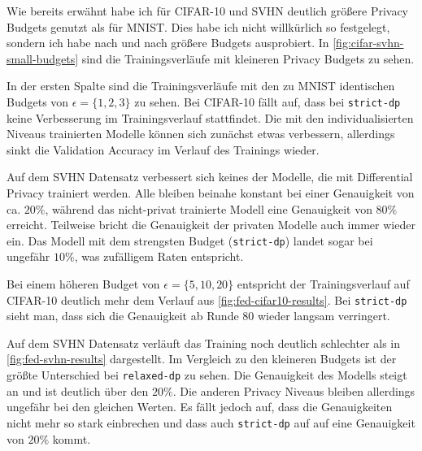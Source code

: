 Wie bereits erwähnt habe ich für CIFAR-10 und SVHN deutlich größere Privacy Budgets genutzt als für MNIST. Dies habe ich nicht willkürlich so festgelegt, sondern ich habe nach und nach größere Budgets ausprobiert. In \autoref{fig:cifar-svhn-small-budgets} sind die Trainingsverläufe mit kleineren Privacy Budgets zu sehen.

In der ersten Spalte sind die Trainingsverläufe mit den zu MNIST identischen Budgets von $\epsilon = \{1,2,3\}$ zu sehen. Bei CIFAR-10 fällt auf, dass bei \texttt{strict-dp} keine Verbesserung im Trainingsverlauf stattfindet. Die mit den individualisierten Niveaus trainierten Modelle können sich zunächst etwas verbessern, allerdings sinkt die Validation Accuracy im Verlauf des Trainings wieder.

Auf dem SVHN Datensatz verbessert sich keines der Modelle, die mit Differential Privacy trainiert werden. Alle bleiben beinahe konstant bei einer Genauigkeit von ca. $20\%$, während das nicht-privat trainierte Modell eine Genauigkeit von $80\%$ erreicht. Teilweise bricht die Genauigkeit der privaten Modelle auch immer wieder ein. Das Modell mit dem strengsten Budget (\texttt{strict-dp}) landet sogar bei ungefähr $10\%$, was zufälligem Raten entspricht.

Bei einem höheren Budget von $\epsilon = \{5, 10, 20\}$ entspricht der Trainingsverlauf auf CIFAR-10 deutlich mehr dem Verlauf aus \autoref{fig:fed-cifar10-results}. Bei \texttt{strict-dp} sieht man, dass sich die Genauigkeit ab Runde $80$ wieder langsam verringert.

Auf dem SVHN Datensatz verläuft das Training noch deutlich schlechter als in \autoref{fig:fed-svhn-results} dargestellt. Im Vergleich zu den kleineren Budgets ist der größte Unterschied bei \texttt{relaxed-dp} zu sehen. Die Genauigkeit des Modells steigt an und ist deutlich über den $20\%$. Die anderen Privacy Niveaus bleiben allerdings ungefähr bei den gleichen Werten. Es fällt jedoch auf, dass die Genauigkeiten nicht mehr so stark einbrechen und dass auch \texttt{strict-dp} auf auf eine Genauigkeit von $20\%$ kommt.

